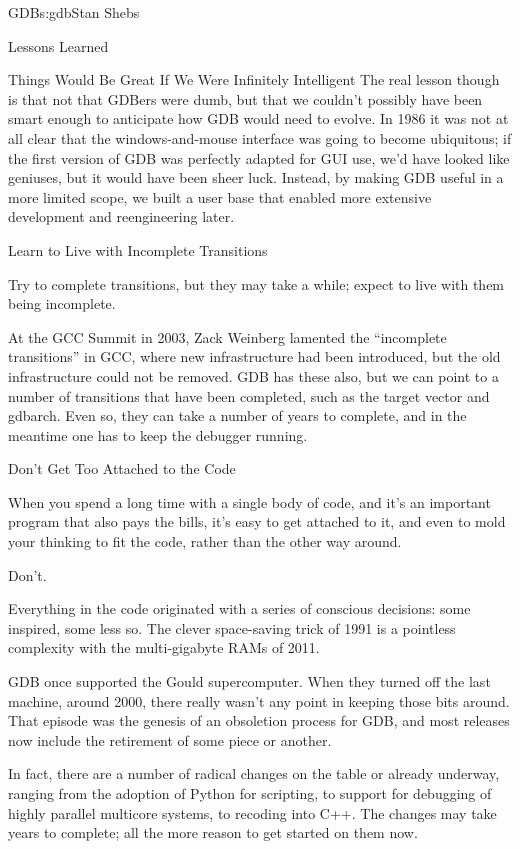 \begin{aosachapter}{GDB}{s:gdb}{Stan Shebs}
\begin{aosasect1}{Lessons Learned}
\begin{aosasect2}{Things Would Be Great If We Were Infinitely Intelligent}
The real lesson though is that not that GDBers were dumb, but that we
couldn't possibly have been smart enough to anticipate how GDB would
need to evolve.  In 1986 it was not at all clear that the
windows-and-mouse interface was going to become ubiquitous; if the
first version of GDB was perfectly adapted for GUI use, we'd have
looked like geniuses, but it would have been sheer luck.  Instead,
by making GDB useful in a more limited scope, we built a user base
that enabled more extensive development and reengineering later.

\end{aosasect2}

\begin{aosasect2}{Learn to Live with Incomplete Transitions}

Try to complete transitions, but they may take a while; expect to live
with them being incomplete.

At the GCC Summit in 2003, Zack Weinberg lamented the ``incomplete
transitions'' in GCC, where new infrastructure had been introduced,
but the old infrastructure could not be removed.  GDB has these also,
but we can point to a number of transitions that have been completed,
such as the target vector and gdbarch.  Even so, they can take a
number of years to complete, and in the meantime one has to keep the
debugger running.

\end{aosasect2}

\begin{aosasect2}{Don't Get Too Attached to the Code}

When you spend a long time with a single body of code, and it's an
important program that also pays the bills, it's easy to get attached
to it, and even to mold your thinking to fit the code, rather than the
other way around.

Don't.

Everything in the code originated with a series of conscious
decisions: some inspired, some less so.  The clever space-saving trick
of 1991 is a pointless complexity with the multi-gigabyte RAMs of
2011.

GDB once supported the Gould supercomputer. When they turned off the
last machine, around 2000, there really wasn't any point in keeping
those bits around.  That episode was the genesis of an obsoletion
process for GDB, and most releases now include the retirement of
some piece or another.

In fact, there are a number of radical changes on the table or already
underway, ranging from the adoption of Python for scripting, to
support for debugging of highly parallel multicore systems, to
recoding into C++.  The changes may take years to complete; all the
more reason to get started on them now.

\end{aosasect2}

\end{aosasect1}

\end{aosachapter}
